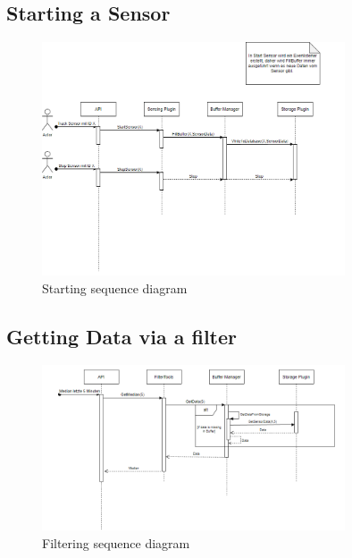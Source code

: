 \documentclass[12pt]{article}
\begin{document}
\subsection{Starting a Sensor}
\begin{figure}[ht]
\centering
\includegraphics[width=0.8\textwidth]{Graphics/SeqStart.png}
\caption{\label{fig:bild17} Starting sequence diagram}
\end{figure}

\newpage
\subsection{Getting Data via a filter}
\begin{figure}[ht]
\centering
\includegraphics[width=0.8\textwidth]{Graphics/SeqFilter.png}
\caption{\label{fig:bild18} Filtering sequence diagram}
\end{figure}
\end{document}
